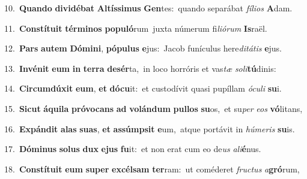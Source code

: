 {{\numbfont\textcolor{\numbcolor}{10.}}~\-\textbf{Quan}\-\textbf{do} \textbf{di}\-\textbf{vi}\textbf{dé}\textbf{bat} \textbf{Al}\-\textbf{tís}\textbf{si}\textbf{mus} \textbf{Gen}\-tes:~\star quando separábat \textit{fí}\-\textit{li}\textit{os} \textbf{A}\-dam.\par
{\numbfont\textcolor{\numbcolor}{11.}}~\-\textbf{Con}\-\textbf{stí}\textbf{tu}\textbf{it} \textbf{tér}\-\textbf{mi}\textbf{nos} \textbf{po}\-\textbf{pu}\textbf{ló}rum~\star juxta númerum fi\-\textit{li}\-\textit{ó}\textit{rum} \textbf{Is}\-raël.\par
{\numbfont\textcolor{\numbcolor}{12.}}~\textbf{Pars} \textbf{au}\-\textbf{tem} \textbf{Dó}\-\textbf{mi}\textbf{ni}, \textbf{pó}\-\textbf{pu}\textbf{lus} \textbf{e}\-jus:~\star Jacob funículus here\-\textit{di}\-\textit{tá}\textit{tis} \textbf{e}\-jus.\par
{\numbfont\textcolor{\numbcolor}{13.}}~\-\textbf{In}\-\textbf{vé}\textbf{nit} \textbf{e}\-\textbf{um} \textbf{in} \textbf{ter}\-\textbf{ra} \textbf{de}\-\textbf{sér}ta,~\star in loco horróris et vas\textit{tæ} \textit{so}\-\textit{li}\textbf{tú}dinis:\par
{\numbfont\textcolor{\numbcolor}{14.}}~\-\textbf{Cir}\-\textbf{cum}\textbf{dú}\textbf{xit} \textbf{e}\-\textbf{um}, \textbf{et} \textbf{dó}\-\textbf{cu}it:~\star et custodívit quasi pupíllam \textit{ó}\-\textit{cu}\textit{li} \textbf{su}\-i.\par
{\numbfont\textcolor{\numbcolor}{15.}}~\-\textbf{Sic}\-\textbf{ut} \textbf{á}\-\textbf{qui}\textbf{la} \textbf{pró}\-\textbf{vo}\textbf{cans} \textbf{ad} \textbf{vo}\-\textbf{lán}\textbf{dum} \textbf{pul}\-\textbf{los} \textbf{su}\-os,~\star et su\textit{per} \textit{e}\-\textit{os} \textbf{vó}\-litans,\par
{\numbfont\textcolor{\numbcolor}{16.}}~\-\textbf{Ex}\-\textbf{pán}\textbf{dit} \textbf{a}\-\textbf{las} \textbf{su}\-\textbf{as}, \textbf{et} \textbf{as}\-\textbf{súmp}\textbf{sit} \textbf{e}\-um,~\star atque portávit in \textit{hú}\-\textit{me}\textit{ris} \textbf{su}\-is.\par
{\numbfont\textcolor{\numbcolor}{17.}}~\-\textbf{Dó}\-\textbf{mi}\textbf{nus} \textbf{so}\-\textbf{lus} \textbf{dux} \textbf{e}\-\textbf{jus} \textbf{fu}\-it:~\star et non erat cum eo de\textit{us} \textit{a}\-\textit{li}\textbf{é}nus.\par
{\numbfont\textcolor{\numbcolor}{18.}}~\-\textbf{Con}\-\textbf{stí}\textbf{tu}\textbf{it} \textbf{e}\-\textbf{um} \textbf{su}\-\textbf{per} \textbf{ex}\-\textbf{cél}\textbf{sam} \textbf{ter}\-ram:~\star ut coméderet \textit{fruc}\-\textit{tus} \textit{a}\-\textbf{gró}rum,\par
}
